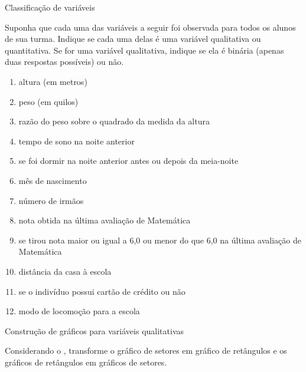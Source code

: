 \begin{task}{ Classificação de variáveis}

Suponha que cada uma das variáveis a seguir foi observada para todos os alunos de sua turma. Indique se cada uma delas é uma variável qualitativa ou quantitativa. Se for uma variável qualitativa, indique se ela é binária (apenas duas respostas possíveis) ou não.
\begin{enumerate}
\item {} 
altura (em metros)

\item {} 
peso (em quilos)

\item {} 
razão do peso sobre o quadrado da medida da altura

\item {} 
tempo de sono na noite anterior

\item {} 
se foi dormir na noite anterior antes ou depois da meia-noite

\item {} 
mês de nascimento

\item {} 
número de irmãos

\item {} 
nota obtida na última avaliação de Matemática

\item {} 
se tirou nota maior ou igual a 6,0 ou menor do que 6,0 na última avaliação de Matemática

\item {} 
distância da casa à escola

\item {} 
se o indivíduo possui cartão de crédito ou não

\item {} 
modo de locomoção para a escola

\end{enumerate}
\end{task}
\label{\detokenize{PE103-2:ativ-3-construcao-de-grafico-variavel-qualitativa}}
\begin{task}{ Construção de gráficos para variáveis qualitativas}

Considerando o {\hyperref[\detokenize{PE103-0:fig-infografico-pnad-4}]{}}, transforme o gráfico de setores em gráfico de retângulos e os gráficos de retângulos em gráficos de setores.
\end{task}

